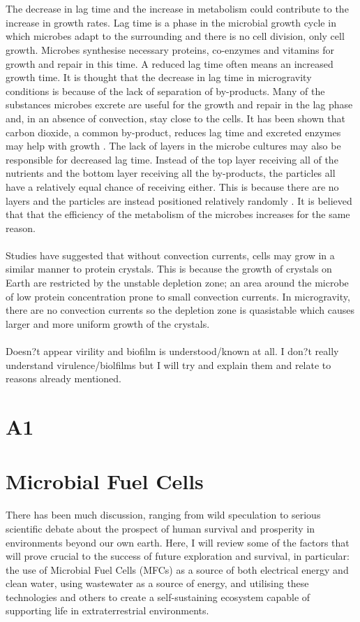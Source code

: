 \documentclass[12pt]{article}
\begin{document}
\\ \\The decrease in lag time and the increase in metabolism could contribute to the increase in growth rates. Lag time is a phase in the microbial growth cycle in which microbes adapt to the surrounding and there is no cell division, only cell growth.  Microbes synthesise necessary proteins, co-enzymes and vitamins for growth and repair in this time. A reduced lag time often means an increased growth time.  It is thought that the decrease in lag time in microgravity conditions is because of the lack of separation of by-products. Many of the substances microbes excrete are useful for the growth and repair in the lag phase and, in an absence of convection, stay close to the cells. It has been shown that carbon dioxide, a common by-product, reduces lag time and excreted enzymes may help with growth . The lack of layers in the microbe cultures may also be responsible for decreased lag time. Instead of the top layer receiving all of the nutrients and the bottom layer receiving all the by-products, the particles all have a relatively equal chance of receiving either. This is because there are no layers and the particles are instead positioned relatively randomly . It is believed that that the efficiency of the metabolism of the microbes increases for the same reason.
\\ \\Studies have suggested that without convection currents, cells may grow in a similar manner to protein crystals.  This is because the growth of crystals on Earth are restricted by the unstable depletion zone; an area around the microbe of low protein concentration prone to small convection currents. In microgravity, there are no convection currents so the depletion zone is quasistable which causes larger and more uniform growth of the crystals. \\ \\
Doesn?t appear virility and biofilm is understood/known at all. I don?t really understand virulence/biolfilms but I will try and explain them and relate to reasons already mentioned.

\section{A1}

\section{Microbial Fuel Cells}
There has been much discussion, ranging from wild speculation to serious scientific debate about the prospect of human survival and prosperity in environments beyond our own earth. Here, I will review some of the factors that will prove crucial to the success of future exploration and survival, in particular: the use of Microbial Fuel Cells (MFCs) as a source of both electrical energy and clean water, using wastewater as a source of energy, and utilising these technologies and others to create a self-sustaining ecosystem capable of supporting life in extraterrestrial environments. 
\end{document}
